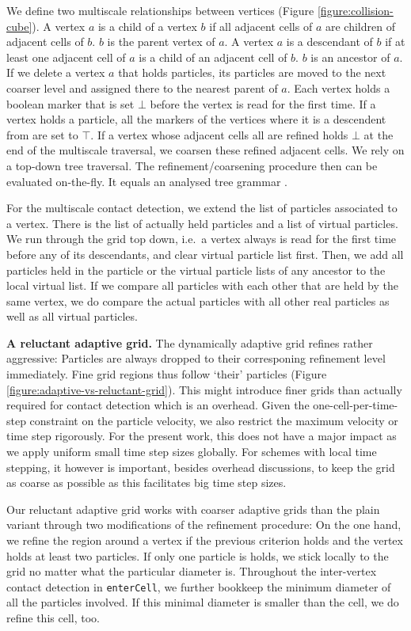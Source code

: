 We define two multiscale relationships between vertices (Figure
\ref{figure:collision-cube}).
A vertex $a$ is a child of a vertex $b$ if all adjacent cells of $a$ are
children of adjacent cells of $b$.
$b$ is the parent vertex of $a$.
A vertex $a$ is a descendant of $b$ if at least one adjacent cell of $a$ is a
child of an adjacent cell of $b$.
$b$ is an ancestor of $a$.
If we delete a vertex $a$ that holds particles, its particles are moved to the
next coarser level and assigned there to the nearest parent of $a$.
Each vertex holds a boolean marker that is set $\bot $ before the vertex is
read for the first time.
If a vertex holds a particle, all the markers of the vertices where it is a
descendent from are set to $\top$.
If a vertex whose adjacent cells all are refined holds $\bot$ at the end of the
multiscale traversal, we coarsen these refined adjacent cells.
We rely on a top-down tree traversal.
The refinement/coarsening procedure then can be evaluated on-the-fly.
It equals an analysed tree grammar \cite{knuth}.

For the multiscale contact detection, we extend the list of particles associated
to a vertex. 
There is the list of actually held particles and a list of virtual particles. 
We run through the grid top down, i.e.~a vertex always is read for the first
time before any of its descendants, and clear virtual particle list first.
Then, we add all particles held in the particle or the virtual particle lists of
any ancestor to the local virtual list.
If we compare all particles with each other that are held by the same vertex, we
do compare the actual particles with all other real particles as well as all
virtual particles.


{\bf A reluctant adaptive grid.}
The dynamically adaptive grid refines rather aggressive: Particles are always
dropped to their corresponing refinement level immediately. 
Fine grid regions thus follow `their' particles (Figure
\ref{figure:adaptive-vs-reluctant-grid}).
This might introduce finer grids than actually required for contact detection
which is an overhead.
Given the one-cell-per-time-step constraint on the particle velocity, we also
restrict the maximum velocity or time step rigorously.
For the present work, this does not have a major impact as we apply uniform
small time step sizes globally. 
For schemes with local time stepping, it however is important, besides overhead
discussions, to keep the grid as coarse as possible as this facilitates big
time step sizes.


Our reluctant adaptive grid works with coarser adaptive grids than the plain
variant through two modifications of the refinement procedure: 
On the one hand, we refine the region around a vertex if the previous criterion
holds and the vertex holds at least two particles.
If only one particle is holds, we stick locally to the grid no matter what the
particular diameter is.
Throughout the inter-vertex contact detection in \texttt{enterCell}, we further
bookkeep the minimum diameter of all the particles involved. 
If this minimal diameter is smaller than the cell, we do refine this cell, too.

